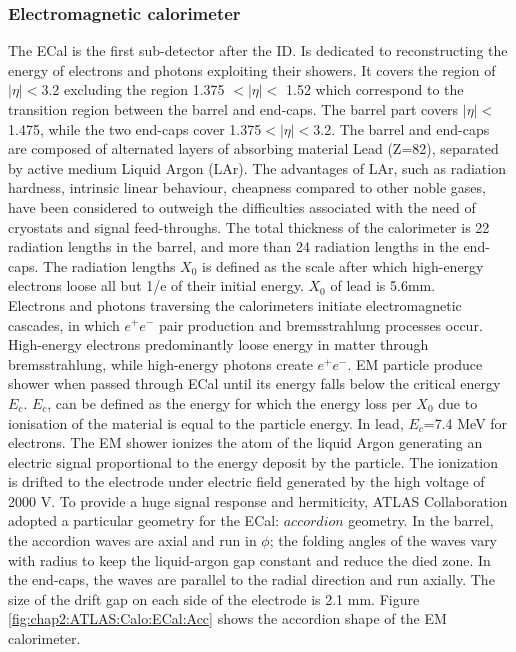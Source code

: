 \subsubsection{Electromagnetic calorimeter}
\label{chap2:ATLAS:Calo:ECAL}
The ECal is the first sub-detector after the ID. Is dedicated to reconstructing the energy of electrons and photons exploiting their showers. It covers the region of $|\eta|<$3.2 excluding the region 1.375 $<|\eta|<$ 1.52 which correspond to the transition region between the barrel and end-caps. The barrel part covers $|\eta|<$1.475, while the two end-caps cover 1.375$<|\eta|<$3.2. The barrel and end-caps are composed of alternated layers of absorbing material Lead (Z=82), separated by active medium Liquid Argon (LAr). The advantages of LAr, such as radiation hardness, intrinsic linear behaviour, cheapness compared to other noble gases, have been considered to outweigh the difficulties associated with the need of cryostats and signal feed-throughs. The total thickness of the calorimeter is 22 radiation lengths in the barrel, and more than 24 radiation lengths in the end-caps. The radiation lengths $X_0$ is defined as the scale after which high-energy electrons loose all but 1/e of their initial energy. $X_0$ of lead is 5.6mm. \\
Electrons and photons traversing the calorimeters initiate electromagnetic cascades, in which $e^+e^-$ pair production and bremsstrahlung processes occur. High-energy electrons predominantly loose energy in matter through bremsstrahlung, while high-energy photons create $e^+e^-$. EM particle produce shower when passed through ECal until its energy falls below the critical energy $E_c$. $E_c$, can be defined as the energy for which the energy loss per $X_0$ due to ionisation of the material is equal to the particle energy. In lead, $E_c$=7.4 MeV for electrons. The EM shower ionizes the atom of the liquid Argon generating an electric signal proportional to the energy deposit by the particle. The ionization is drifted to the electrode under electric field generated by the high voltage of 2000 V. To provide a huge signal response and hermiticity, ATLAS Collaboration adopted a particular geometry for the ECal: $accordion$ geometry. In the barrel, the accordion waves are axial and run in $\phi$; the folding angles of the waves vary with radius to keep the liquid-argon gap constant and reduce the died zone. In the end-caps, the waves are parallel to the radial direction and run axially. The size of the drift gap on each side of the electrode is 2.1 mm. Figure \ref{fig:chap2:ATLAS:Calo:ECal:Acc} shows the accordion shape of the EM calorimeter.
